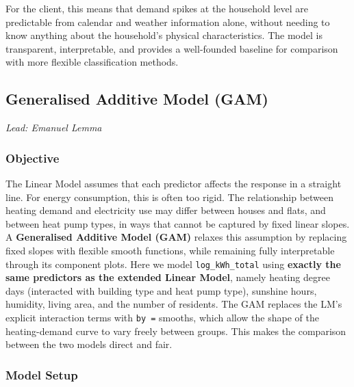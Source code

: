 \documentclass[
]{article}
\begin{document}
For the client, this means that demand spikes at the household level are
predictable from calendar and weather information alone, without needing
to know anything about the household's physical characteristics. The
model is transparent, interpretable, and provides a well-founded
baseline for comparison with more flexible classification methods.

\subsection{Generalised Additive Model (GAM)}\label{gam}

\emph{Lead: Emanuel Lemma}

\subsubsection{Objective}\label{objective-3}

The Linear Model assumes that each predictor affects the response in a
straight line. For energy consumption, this is often too rigid. The
relationship between heating demand and electricity use may differ
between houses and flats, and between heat pump types, in ways that
cannot be captured by fixed linear slopes. A \textbf{Generalised
Additive Model (GAM)} relaxes this assumption by replacing fixed slopes
with flexible smooth functions, while remaining fully interpretable
through its component plots. Here we model \texttt{log\_kWh\_total}
using \textbf{exactly the same predictors as the extended Linear Model},
namely heating degree days (interacted with building type and heat pump
type), sunshine hours, humidity, living area, and the number of
residents. The GAM replaces the LM's explicit interaction terms with
\texttt{by\ =} smooths, which allow the shape of the heating-demand
curve to vary freely between groups. This makes the comparison between
the two models direct and fair.

\subsubsection{Model Setup}\label{model-setup-3}
\end{document}
